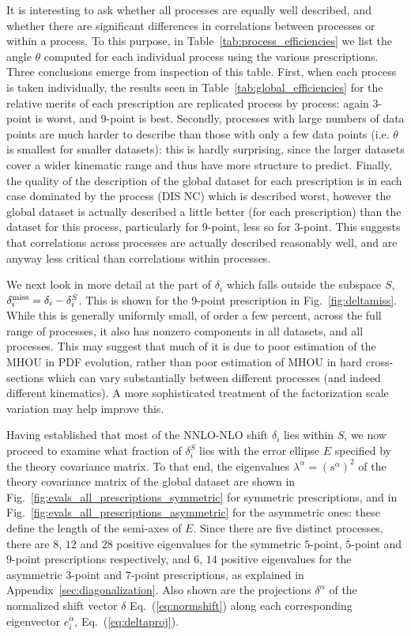 It is interesting to ask whether all processes are equally well
described, and whether there are significant differences in
correlations between processes or within a process. 
To this purpose, in Table~\ref{tab:process_efficiencies} we list the angle 
$\theta$ computed for each individual process using the various prescriptions.
Three conclusions emerge from inspection of this table. First, when each process is taken individually, the results seen in Table~\ref{tab:global_efficiencies} for the relative merits of each prescription are replicated process by process: again 3-point is worst, and 9-point is best.
%
Secondly, processes with large numbers of data points are much harder to describe than those with only a few data points (i.e. $\theta$ is smallest for smaller datasets): this is hardly surprising, since the larger datasets cover a wider kinematic range and thus have more structure to predict. Finally, the quality of the description of the global
dataset for each prescription is in each case dominated by the process (DIS NC) which is described worst, however the global dataset is actually described a little better (for each prescription) than the dataset for this process, particularly for 9-point, less so for 3-point.
%
This suggests that correlations across 
processes are actually described reasonably well, and are anyway less critical than correlations within processes.

We next look in more detail at the part of $\delta_i$ which falls outside the subspace $S$, $\delta^{\rm miss}_i = \delta_i-\delta^S_i$. This is shown for the 9-point prescription in Fig.~\ref{fig:deltamiss}. While this is generally uniformly small, of order a few percent, across the full range of processes, it also has nonzero components in all datasets, and all processes. This may suggest that much of it is due to poor estimation of the MHOU in PDF evolution, rather than poor estimation of MHOU in hard cross-sections which can vary substantially between different processes (and indeed different kinematics). A more sophisticated treatment of the factorization scale variation may help improve this.

Having established that most of the NNLO-NLO shift $\delta_i$ lies within $S$, we now proceed to examine what fraction of $\delta^S_i$ lies with the error ellipse $E$ specified by the theory covariance matrix. To that end, the 
eigenvalues $\lambda^\alpha = (s^\alpha)^2$ of the theory covariance 
matrix of the global dataset are shown in
Fig.~\ref{fig:evals_all_prescriptions_symmetric} for symmetric
prescriptions, and in
Fig.~\ref{fig:evals_all_prescriptions_asymmetric} for the asymmetric
ones: these define the length of the semi-axes of $E$. Since there are five distinct processes, there are $8$, $12$ and $28$ positive eigenvalues for the symmetric $5$-point, $\overline{5}$-point and $9$-point prescriptions respectively, and $6$, $14$ positive eigenvalues for the asymmetric $3$-point and $7$-point prescriptions, as explained in Appendix~\ref{sec:diagonalization}. Also shown are the projections $\delta^\alpha$ of the 
normalized shift vector $\delta$ Eq.~(\ref{eq:normshift}) along each 
corresponding eigenvector $e^\alpha_i$, Eq.~(\ref{eq:deltaproj}).

